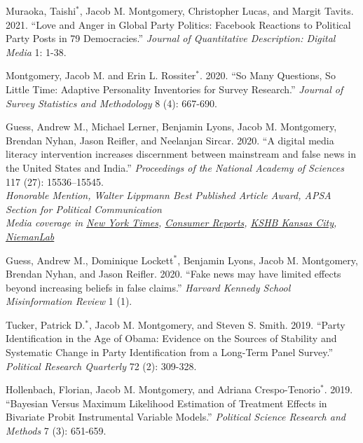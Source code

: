 \documentclass[10pt]{article}
\renewenvironment{CV}
  {\begin{list}{}
    {\renewcommand{\makelabel}{\entrylabel}
    \setlength{\labelwidth}{55pt}
    \setlength{\leftmargin}{62pt}
  }}
  {\end{list}}
\newcommand{\cvnote}[1]{\\[0.1em]{\hspace*{0.5em}\small\itshape #1}}
\newcommand{\student}[1]{#1$^{*}$}
\begin{document}
\begin{CV}
\item[]   \student{Muraoka, Taishi}, Jacob M. Montgomery, Christopher Lucas, and Margit Tavits. 2021. ``Love and Anger in Global Party Politics: Facebook Reactions to Political Party Posts in 79 Democracies.'' \textit{Journal of Quantitative Description: Digital Media} 1: 1-38.


\item[] Montgomery, Jacob M. and \student{Erin L. Rossiter}. 2020. ``So Many Questions, So Little
Time: Adaptive Personality Inventories for Survey Research.'' \textit{Journal of Survey Statistics
  and Methodology} 8 (4): 667-690.

\item[] Guess, Andrew M.,  Michael Lerner, Benjamin
  Lyons, Jacob M. Montgomery, Brendan Nyhan, Jason Reifler, and Neelanjan
  Sircar. 2020. ``A digital media literacy intervention increases
  discernment between mainstream and false news in the United States
  and India.'' \textit{Proceedings of the National Academy of
    Sciences} 117 (27): 15536--15545.\cvnote{Honorable Mention, Walter Lippmann Best Published Article Award,
APSA Section for Political Communication}\cvnote{Media coverage in
\href{https://www.nytimes.com/2020/09/11/health/misinformation-social-media-elderly.html}{New
  York Times},
\href{https://www.consumerreports.org/social-media/facebook-gave-tips-to-spot-fake-news-a-study-says-they-work/}{Consumer
  Reports},
 \href{https://www.youtube.com/channel/UCzhtAFR4aiLOr8IWqA92-5w}{KSHB
   Kansas City}, \href{https://tinyurl.com/evph5884}{NiemanLab}}
                               

\item[] Guess, Andrew M., \student{Dominique Lockett},
  Benjamin Lyons, Jacob M. Montgomery, Brendan Nyhan, and Jason
  Reifler. 2020. ``Fake news may have limited effects beyond
  increasing beliefs in false claims.'' \textit{Harvard Kennedy School
    Misinformation Review} 1 (1).

\item[] \student{Tucker, Patrick D.}, Jacob
  M. Montgomery, and Steven S. Smith.  2019. ``Party Identification in
  the Age of Obama: Evidence on the Sources of Stability and
  Systematic Change in Party Identification from a Long-Term Panel
  Survey.'' \textit{Political Research Quarterly} 72 (2): 309-328.

\item[] Hollenbach, Florian, Jacob M. Montgomery, and
  \student{Adriana Crespo-Tenorio}. 2019. ``Bayesian Versus Maximum Likelihood Estimation of Treatment Effects in Bivariate Probit Instrumental Variable Models.'' \textit{Political Science Research and Methods} 7 (3): 651-659.


\end{CV}
\end{document}

